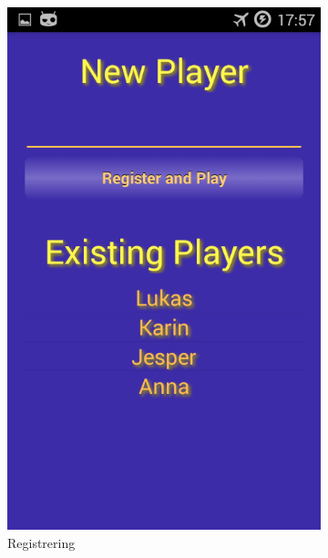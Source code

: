 \begin{figure}[ht]
    \centering
    \begin{subfigure}[b]{0.25\textwidth}
        \includegraphics[width=\textwidth]{./img/bruksanvisning/2.png}
        \caption{Registrering}
        \label{fig:registrering}
    \end{subfigure}
    \begin{subfigure}[b]{0.25\textwidth}

\end{subfigure}
\end{figure}
